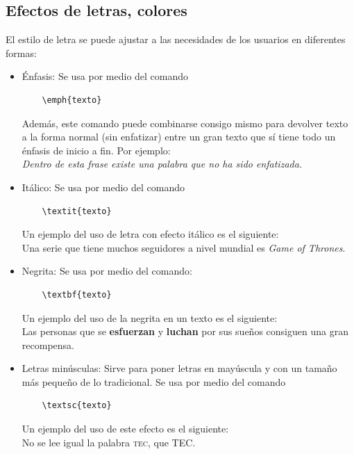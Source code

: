 \documentclass[10pt,journal,compsoc]{IEEEtran}
\begin{document}
\subsection{Efectos de letras, colores}
El estilo de letra se puede ajustar a las necesidades de los usuarios en diferentes formas: \\
\begin{itemize}
	
	\item \'Enfasis: Se usa por medio del comando \\
	\begin{lstlisting}
	\emph{texto}
	\end{lstlisting}
	Adem\'as, este comando puede combinarse consigo mismo para devolver texto a la forma normal (sin enfatizar) entre un gran texto que s\'i tiene todo un \'enfasis de inicio a fin. Por ejemplo: \\
	\emph{Dentro de esta frase existe una \emph{palabra} que no ha sido enfatizada.}
	
	\item It\'alico: Se usa por medio del comando \\
	\begin{lstlisting}
	\textit{texto}
	\end{lstlisting}
	Un ejemplo del uso de letra con efecto it\'alico es el siguiente: \\
	Una serie que tiene muchos seguidores a nivel mundial es \textit{Game of Thrones}.
	
	\item Negrita: Se usa por medio del comando: \\
	\begin{lstlisting}
	\textbf{texto}
	\end{lstlisting}
	Un ejemplo del uso de la negrita en un texto es el siguiente: \\
	Las personas que se \textbf{esfuerzan} y \textbf{luchan} por sus sue\~nos consiguen una gran recompensa.
	
	\item Letras min\'usculas: Sirve para poner letras en may\'uscula y con un tama\~no m\'as peque\~no de lo tradicional. Se usa por medio del comando \\
	\begin{lstlisting}
	\textsc{texto}
	\end{lstlisting}
	Un ejemplo del uso de este efecto es el siguiente: \\
	No se lee igual la palabra \textsc{tec}, que TEC. 
	

\end{itemize}
\end{document}
